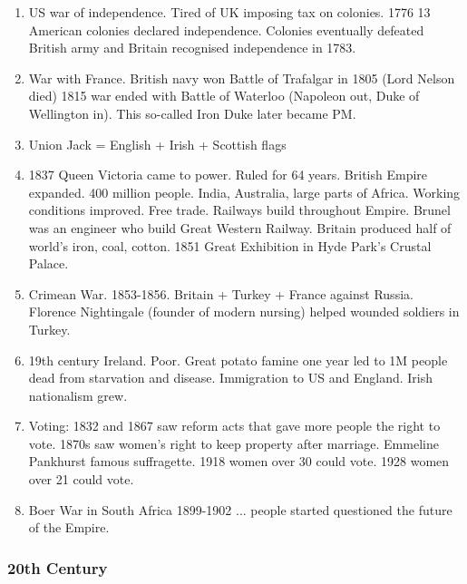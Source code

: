\documentclass[10pt,reqno]{amsart}
\begin{document}
\begin{enumerate}[i]
\item US war of independence. Tired of UK imposing tax on colonies. 1776 13 American colonies declared independence. Colonies eventually defeated British army and Britain recognised independence in 1783. 
\item War with France. British navy won Battle of Trafalgar in 1805 (Lord Nelson died)
1815 war ended with Battle of Waterloo (Napoleon out, Duke of Wellington in). This so-called Iron Duke later became PM.
\item Union Jack = English + Irish + Scottish flags 
\item 1837 Queen Victoria came to power. Ruled for 64 years. British Empire expanded. 400 million people. India, Australia, large parts of Africa. Working conditions improved. Free trade. Railways build throughout Empire. Brunel was an engineer who build Great Western Railway. Britain produced half of world's iron, coal, cotton. 1851 Great Exhibition in Hyde Park's Crustal Palace. 
\item Crimean War. 1853-1856. Britain + Turkey + France against Russia. 
Florence Nightingale (founder of modern nursing) helped wounded soldiers in Turkey. 
\item 19th  century Ireland. Poor. Great potato famine one year led to 1M people dead from starvation and disease. Immigration to US and England. Irish nationalism grew. 
\item Voting:
1832 and 1867 saw reform acts that gave more people the right to vote. 
1870s saw women's right to keep property after marriage. 
Emmeline Pankhurst famous suffragette. 1918 women over 30 could vote. 1928 women over 21 could vote. 
\item Boer War in South Africa 1899-1902 ... people started questioned the future of the Empire.  
\end{enumerate}



\subsubsection{20th Century}
\end{document}
